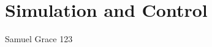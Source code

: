 \newpage
{}
\section{Simulation and Control} \label{simulationandcontrol}

Samuel Grace 123 \cite{cabreira2019cpp}